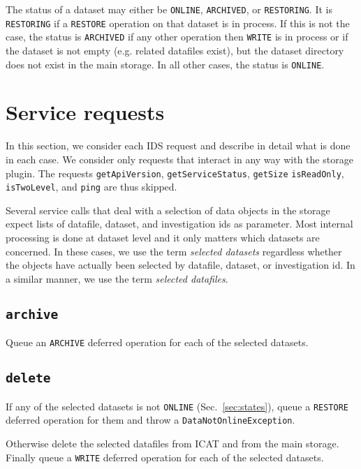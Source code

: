 \documentclass[paper=a4]{scrartcl}
\begin{document}
The status of a dataset may either be \texttt{ONLINE},
\texttt{ARCHIVED}, or \texttt{RESTORING}.  It is \texttt{RESTORING} if
a \texttt{RESTORE} operation on that dataset is in process.  If this
is not the case, the status is \texttt{ARCHIVED} if any other
operation then \texttt{WRITE} is in process or if the dataset is not
empty (e.g. related datafiles exist), but the dataset directory does
not exist in the main storage.  In all other cases, the status is
\texttt{ONLINE}.


\section{Service requests}
\label{sec:requests}

In this section, we consider each IDS request and describe in detail
what is done in each case.  We consider only requests that interact in
any way with the storage plugin.  The requests \texttt{getApiVersion},
\texttt{getServiceStatus}, \texttt{getSize} \texttt{isReadOnly},
\texttt{isTwoLevel}, and \texttt{ping} are thus skipped.

Several service calls that deal with a selection of data objects in
the storage expect lists of datafile, dataset, and investigation ids
as parameter.  Most internal processing is done at dataset level and
it only matters which datasets are concerned.  In these cases, we use
the term \emph{selected datasets} regardless whether the objects have
actually been selected by datafile, dataset, or investigation id.  In
a similar manner, we use the term \emph{selected datafiles}.

\subsection{\texttt{archive}}

Queue an \texttt{ARCHIVE} deferred operation for each of the selected
datasets.

\subsection{\texttt{delete}}

If any of the selected datasets is not \texttt{ONLINE}
(Sec.\ \ref{sec:states}), queue a \texttt{RESTORE} deferred operation
for them and throw a \texttt{DataNotOnlineException}.

Otherwise delete the selected datafiles from ICAT and from the main
storage.  Finally queue a \texttt{WRITE} deferred operation for each
of the selected datasets.
\end{document}

